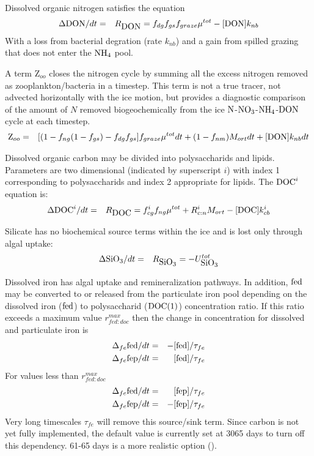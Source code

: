 Dissolved organic nitrogen satisfies the equation
\begin{eqnarray}
\Delta \mbox{DON}/dt & = & R_{\mbox{DON}} = f_{dg}f_{gs}f_{graze}\mu^{tot} - [\mbox{DON}]k_{nb}
\end{eqnarray}
With a loss from bacterial degration (rate $k_{nb}$) and a gain from
spilled grazing that does not enter the $\mbox{NH$_4$}$ pool.  

A term Z$_{oo}$ closes the nitrogen cycle by summing all the excess nitrogen removed as zooplankton/bacteria in a timestep.  This term
is not a true tracer, \bgcie  not advected horizontally with the ice motion,
but provides a diagnostic comparison of the amount of $N$ removed
biogeochemically from the ice $\mbox{N}$-$\mbox{NO$_3$}$-$\mbox{NH$_4$}$-$\mbox{DON}$ cycle at each
timestep.
\begin{eqnarray}
\mbox{Z}_{oo} & = & [(1-f_{ng}(1-f_{gs}) - f_{dg}f_{gs}]f_{graze}\mu^{tot}dt + (1-f_{nm})M_{ort}dt  +
[\mbox{DON}]k_{nb}dt \nonumber
\end{eqnarray}

Dissolved organic carbon may be divided into polysaccharids and
lipids.  Parameters are two dimensional (indicated by superscript $i$)
with index 1 corresponding to
polysaccharids and index 2 appropriate for lipids.  The $\mbox{DOC}^i$
equation is:
\begin{eqnarray}
\Delta \mbox{DOC}^i/dt & = & R_{\mbox{DOC}} = f^i_{cg}f_{ng}\mu^{tot} + R^i_{c:n}M_{ort}-[\mbox{DOC}]k^i_{cb}
\end{eqnarray}

Silicate has no biochemical source terms within the ice and is lost
only through algal uptake:
\begin{eqnarray}
\Delta \mbox{SiO$_3$}/dt & = & R_{\mbox{SiO$_3$}} = -U_{\mbox{SiO$_3$}}^{tot}
\end{eqnarray}

Dissolved iron has algal uptake and  remineralization pathways. In
addition, $\mbox{fed}$ may be converted to or released from the particulate
iron pool depending on the dissolved iron ($\mbox{fed}$) to polysaccharid ($\mbox{DOC}(1)$)
concentration ratio.  If this ratio exceeds a maximum value
$r^{max}_{fed:doc}$ then the change in concentration for dissolved and
particulate iron is
\begin{eqnarray}
\Delta_{fe}\mbox{fed}/dt & = & -[\mbox{fed}]/\tau_{fe} \nonumber \\
\Delta_{fe}\mbox{fep}/dt & = & [\mbox{fed}]/\tau_{fe}
\end{eqnarray}
For values less than $r^{max}_{fed:doc}$
\begin{eqnarray}
\Delta_{fe}\mbox{fed}/dt & = & [\mbox{fep}]/\tau_{fe} \nonumber \\
\Delta_{fe}\mbox{fep}/dt & = & -[\mbox{fep}]/\tau_{fe}
\end{eqnarray}
Very long timescales $\tau_{fe}$ will remove this source/sink
term. Since carbon is not yet fully implemented, the default value is currently set at 3065 days to turn off this
dependency. 61-65 days is a more realistic option (\cite{Parekh:iron:2004}).
 
